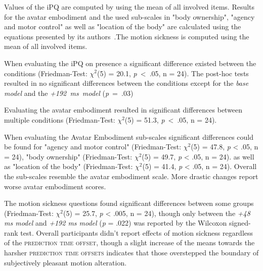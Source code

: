 \documentclass[sigconf]{acmart}
\begin{document}
Values of the iPQ are computed by using the mean of all involved items. Results for the avatar embodiment and the used sub-scales in "body ownership", "agency and motor control" as well as "location of the body" are calculated using the equations presented by its authors~\cite{Gonzalez-Franco2018}.The motion sickness is computed using the mean of all involved items.

When evaluating the iPQ on presence a significant difference existed between the conditions (Friedman-Test: $\chi^2$(5) = 20.1, \mbox{\textit{p} < .05}, n = 24).
The post-hoc tests resulted in no significant differences between the conditions except for the \textit{base model} and the \mbox{\textit{+192 ms model}} (\mbox{\textit{p} = .03})

	
Evaluating the avatar embodiment resulted in significant differences between multiple conditions (Friedman-Test: $\chi^2$(5) = 51.3, \mbox{\textit{p} < .05}, n = 24). 

When evaluating the Avatar Embodiment sub-scales significant differences could be found for
"agency and motor control" (Friedman-Test: $\chi^2$(5) = 47.8, \textit{p} < .05, n = 24),
"body ownership" (Friedman-Test: $\chi^2$(5) = 49.7, \textit{p} < .05, n = 24). as well as 
"location of the body" (Friedman-Test: $\chi^2$(5) = 41.4, \textit{p} < .05, n = 24). Overall the sub-scales resemble the avatar embodiment scale. More drastic changes report worse avatar embodiment scores.  
	
The motion sickness questions found significant differences between some groups (Friedman-Test: $\chi^2$(5) = 25.7, \textit{p} < .005, n = 24), though only between the \textit{+48 ms model} and \textit{+192 ms model} (\textit{p} = .022) was reported by the Wilcoxon signed-rank test. Overall participants didn't report effects of motion sickness regardless of the \textsc{prediction time offset}, though a slight increase of the means towards the harsher \textsc{prediction time offsets} indicates that those overstepped the boundary of subjectively pleasant motion alteration.
\end{document}
